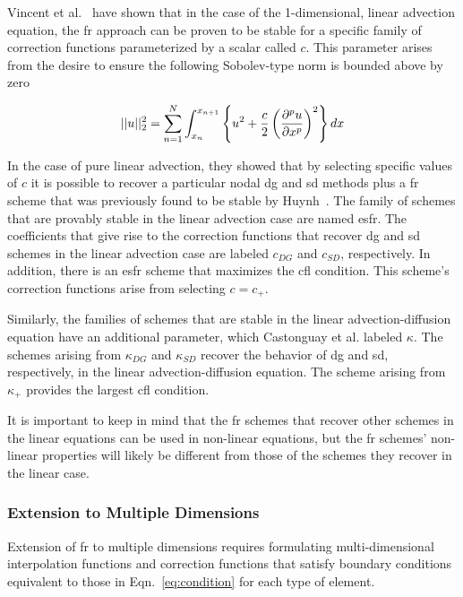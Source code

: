 Vincent et al.~\cite{vincent2011new} have shown that in the case of the 1-dimensional, linear advection equation, the \gls{fr} approach can be proven to be stable for a specific family of correction functions parameterized by a scalar called $c$. This parameter arises from the desire to ensure the following Sobolev-type norm is bounded above by zero

\begin{equation}
||u||^2_2=\sum_{n=1}^{N}\int_{x_n}^{x_{n+1}} \left\{ u^2 + 
\frac{c}{2} \left( {\frac{\partial ^p u}{\partial x^p}} \right)^2 \right\} dx
\end{equation}

In the case of pure linear advection, they showed that by selecting specific values of $c$ it is possible to recover a particular nodal \gls{dg} and \gls{sd} methods plus a \gls{fr} scheme that was previously found to be stable by Huynh~\cite{huynh2007flux}. The family of schemes that are provably stable in the linear advection case are named \gls{esfr}. The coefficients that give rise to the correction functions that recover \gls{dg} and \gls{sd} schemes in the linear advection case are labeled $c_{DG}$ and $c_{SD}$, respectively. In addition, there is an \gls{esfr} scheme that maximizes the \gls{cfl} condition. This scheme's correction functions arise from selecting $c = c_{+}$.

Similarly, the families of schemes that are stable in the linear advection-diffusion equation have an additional parameter, which Castonguay et al. \cite{castonguay2013energy} labeled $\kappa$. The schemes arising from $\kappa_{DG}$ and $\kappa_{SD}$ recover the behavior of \gls{dg} and \gls{sd}, respectively, in the linear advection-diffusion equation. The scheme arising from $\kappa_{+}$ provides the largest \gls{cfl} condition.

It is important to keep in mind that the \gls{fr} schemes that recover other schemes in the linear equations can be used in non-linear equations, but the \gls{fr} schemes' non-linear properties will likely be different from those of the schemes they recover in the linear case. 
\subsubsection{Extension to Multiple Dimensions}
\label{sec:extension_multiple_dimensions}

Extension of \gls{fr} to multiple dimensions requires formulating multi-dimensional interpolation functions and correction functions that satisfy boundary conditions equivalent to those in Eqn.~\eqref{eq:condition} for each type of element.

